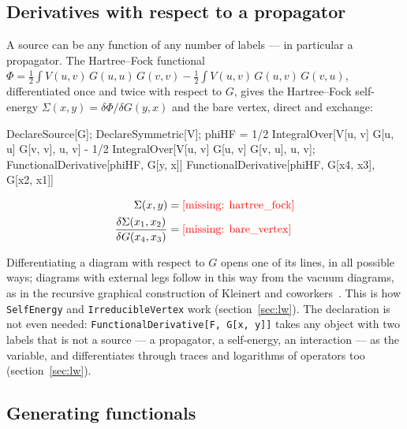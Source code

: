 \documentclass[11pt,a4paper]{article}
\newcommand{\formula}[1]{\IfFileExists{figures/formula_#1.tex}{}{\text{\textcolor{red}{[missing: \detokenize{#1}]}}}}
\newcommand{\pkg}[1]{\texttt{#1}}
\begin{document}
\subsection{Derivatives with respect to a propagator}

A source can be any function of any number of labels --- in particular a propagator. The Hartree--Fock functional
$\Phi=\frac12\int V(u,v)\,G(u,u)\,G(v,v)-\frac12\int V(u,v)\,G(u,v)\,G(v,u)$, differentiated once and twice with respect to
$G$, gives the Hartree--Fock self-energy $\Sigma(x,y)=\delta\Phi/\delta G(y,x)$ and the bare vertex, direct and exchange:
\begin{code}
DeclareSource[G]; DeclareSymmetric[V];
phiHF = 1/2 IntegralOver[V[u, v] G[u, u] G[v, v], {u, v}] -
    1/2 IntegralOver[V[u, v] G[u, v] G[v, u], {u, v}];
FunctionalDerivative[phiHF, G[y, x]]
FunctionalDerivative[phiHF, G[x4, x3], G[x2, x1]]
\end{code}
\begin{outputbox}
\vspace{-6pt}
\begin{align*}
\Sigma(x,y)&=\formula{hartree_fock}\\
\frac{\delta\Sigma(x_1,x_2)}{\delta G(x_4,x_3)}&=\formula{bare_vertex}
\end{align*}
\end{outputbox}
Differentiating a diagram with respect to $G$ opens one of its lines, in all possible ways; diagrams with external legs
follow in this way from the vacuum diagrams, as in the recursive graphical construction of Kleinert and
coworkers~\cite{Kleinert1982,KleinertPelsterKasteningBachmann2000,PelsterGlaum2003}. This is how \pkg{SelfEnergy} and
\pkg{IrreducibleVertex} work (section~\ref{sec:lw}). The declaration is not even needed: \pkg{FunctionalDerivative[F, G[x,
y]]} takes any object with two labels that is not a source --- a propagator, a self-energy, an interaction --- as the
variable, and differentiates through traces and logarithms of operators too (section~\ref{sec:lw}).

\subsection{Generating functionals}
\end{document}
